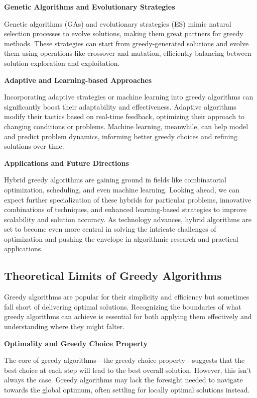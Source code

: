 \documentclass[12pt]{book} %
\begin{document}
\textbf{Genetic Algorithms and Evolutionary Strategies}

Genetic algorithms (GAs) and evolutionary strategies (ES) mimic natural selection processes to evolve solutions, making them great partners for greedy methods. These strategies can start from greedy-generated solutions and evolve them using operations like crossover and mutation, efficiently balancing between solution exploration and exploitation.

\textbf{Adaptive and Learning-based Approaches}

Incorporating adaptive strategies or machine learning into greedy algorithms can significantly boost their adaptability and effectiveness. Adaptive algorithms modify their tactics based on real-time feedback, optimizing their approach to changing conditions or problems. Machine learning, meanwhile, can help model and predict problem dynamics, informing better greedy choices and refining solutions over time.

\textbf{Applications and Future Directions}

Hybrid greedy algorithms are gaining ground in fields like combinatorial optimization, scheduling, and even machine learning. Looking ahead, we can expect further specialization of these hybrids for particular problems, innovative combinations of techniques, and enhanced learning-based strategies to improve scalability and solution accuracy. As technology advances, hybrid algorithms are set to become even more central in solving the intricate challenges of optimization and pushing the envelope in algorithmic research and practical applications.


\subsection{Theoretical Limits of Greedy Algorithms}

Greedy algorithms are popular for their simplicity and efficiency but sometimes fall short of delivering optimal solutions. Recognizing the boundaries of what greedy algorithms can achieve is essential for both applying them effectively and understanding where they might falter.

\textbf{Optimality and Greedy Choice Property}

The core of greedy algorithms—the greedy choice property—suggests that the best choice at each step will lead to the best overall solution. However, this isn't always the case. Greedy algorithms may lack the foresight needed to navigate towards the global optimum, often settling for locally optimal solutions instead.
\end{document}
